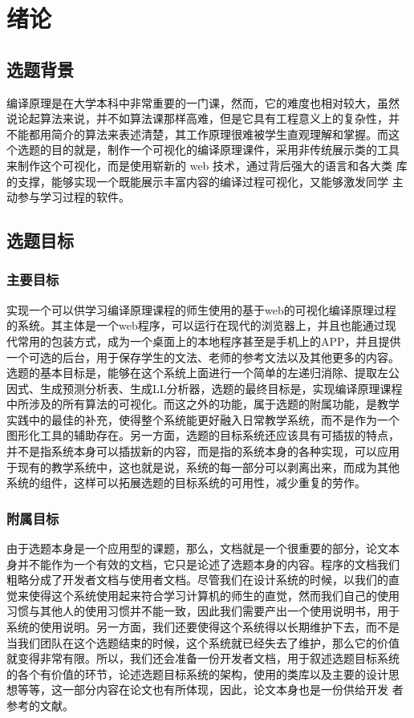 \section{绪论}
\subsection{选题背景}
编译原理是在大学本科中非常重要的一门课，然而，它的难度也相对较大，虽然
说论起算法来说，并不如算法课那样高难，但是它具有工程意义上的复杂性，并
不能都用简介的算法来表述清楚，其工作原理很难被学生直观理解和掌握。而这
个选题的目的就是，制作一个可视化的编译原理课件，采用非传统展示类的工具
来制作这个可视化，而是使用崭新的 web 技术，通过背后强大的语言和各大类
库的支撑，能够实现一个既能展示丰富内容的编译过程可视化，又能够激发同学
主动参与学习过程的软件。
\subsection{选题目标}
\subsubsection{主要目标}
实现一个可以供学习编译原理课程的师生使用的基于web的可视化编译原理过程
的系统。其主体是一个web程序，可以运行在现代的浏览器上，并且也能通过现
代常用的包装方式，成为一个桌面上的本地程序甚至是手机上的APP，并且提供
一个可选的后台，用于保存学生的文法、老师的参考文法以及其他更多的内容。
选题的基本目标是，能够在这个系统上面进行一个简单的左递归消除、提取左公
因式、生成预测分析表、生成LL分析器，选题的最终目标是，实现编译原理课程
中所涉及的所有算法的可视化。而这之外的功能，属于选题的附属功能，是教学
实践中的最佳的补充，使得整个系统能更好融入日常教学系统，而不是作为一个
图形化工具的辅助存在。另一方面，选题的目标系统还应该具有可插拔的特点，
并不是指系统本身可以插拔新的内容，而是指的系统本身的各种实现，可以应用
于现有的教学系统中，这也就是说，系统的每一部分可以剥离出来，而成为其他
系统的组件，这样可以拓展选题的目标系统的可用性，减少重复的劳作。
\subsubsection{附属目标}
由于选题本身是一个应用型的课题，那么，文档就是一个很重要的部分，论文本
身并不能作为一个有效的文档，它只是论述了选题本身的内容。程序的文档我们
粗略分成了开发者文档与使用者文档。尽管我们在设计系统的时候，以我们的直
觉来使得这个系统使用起来符合学习计算机的师生的直觉，然而我们自己的使用
习惯与其他人的使用习惯并不能一致，因此我们需要产出一个使用说明书，用于
系统的使用说明。另一方面，我们还要使得这个系统得以长期维护下去，而不是
当我们团队在这个选题结束的时候，这个系统就已经失去了维护，那么它的价值
就变得非常有限。所以，我们还会准备一份开发者文档，用于叙述选题目标系统
的各个有价值的环节，论述选题目标系统的架构，使用的类库以及主要的设计思
想等等，这一部分内容在论文也有所体现，因此，论文本身也是一份供给开发
者参考的文献。
